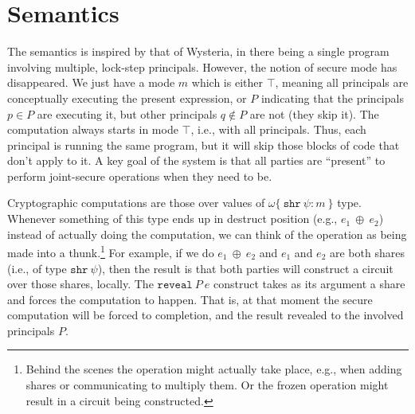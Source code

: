 \documentclass[10pt]{article}
\newcommand{\kw}[1]{\ensuremath{\mathtt{#1}}}
\newcommand{\sshare}[1]{\ensuremath{\mathtt{shr}~{#1}}}
\newcommand{\sectyp}[3]{\ensuremath{{#1} \{~{#2}:{#3}~\}}}
\newcommand{\ebinop}[2]{\ensuremath{{#1}~\oplus~{#2}}}
\newcommand{\ereveal}[2]{\ensuremath{\kw{reveal}~{#1}~{#2}}}
\newcommand{\mwh}[1]{\textcolor{red}{Mike: #1}}
\begin{document}


\section{Semantics}

The semantics is inspired by that of Wysteria, in there being a single
program involving multiple, lock-step principals. However, the notion
of secure mode has disappeared. We just have a mode $m$ which is
either $\top$, meaning all principals are conceptually executing the
present expression, or $P$ indicating that the principals
$p \in P$ are executing it, but other principals $q \not\in P$ are not
(they skip it). The computation always starts in mode $\top$, i.e.,
with all principals. Thus, each principal is running the same program,
but it will skip those blocks of code that don't apply to it.  A key
goal of the system is that all parties are ``present'' to perform
joint-secure operations when they need to be.

Cryptographic computations are those over values of
$\sectyp{\omega}{\sshare{\psi}}{m}$ type. Whenever something of this
type ends up in destruct position (e.g., $\ebinop{e_1}{e_2}$) instead
of actually doing the computation, we can think of the operation as
being made into a thunk.\footnote{Behind the scenes the operation
  might actually take place, e.g., when adding shares or communicating
  to multiply them. Or the frozen operation might result in a circuit
  being constructed.} For example, if we do $\ebinop{e_1}{e_2}$ and
$e_1$ and $e_2$ are both shares (i.e., of type $\sshare{\psi}$), then
the result is that both parties will construct a circuit over those
shares, locally. The $\ereveal{P}{e}$ construct takes as its argument
a share and forces the computation to happen. That is, at that moment
the secure computation will be forced to completion, and the result
revealed to the involved principals $P$.
\end{document}
